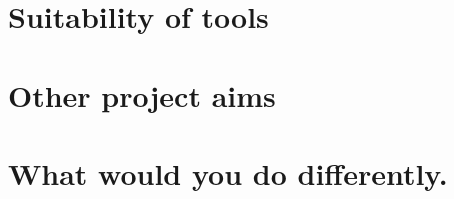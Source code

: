 \section{Suitability of tools}

\section{Other project aims}

\section{What would you do differently.}













